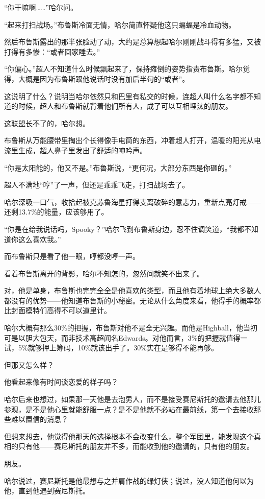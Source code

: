 \documentclass[../main]{subfiles}
\begin{document}
“你干嘛啊\ldots\ldots”哈尔问。

“起来打扫战场。”布鲁斯冷面无情，哈尔简直怀疑他这只蝙蝠是冷血动物。

然后布鲁斯露出的那半张脸动了动，大约是总算想起哈尔刚刚战斗得有多猛，又被打得有多惨：“或者回家睡去。”

“你偏心。”超人不知道什么时候飘起来了，保持瘫倒的姿势指责布鲁斯。哈尔觉得，大概是因为布鲁斯跟他说话时没有加后半句的“或者”。

这说明了什么？说明当哈尔依然只和巴里有私交的时候，连超人叫什么名字都不知道的时候，超人和布鲁斯就背着他们所有人，成了可以互相埋汰的朋友。

这联盟长不了的，哈尔想。

布鲁斯从万能腰带里掏出个长得像手电筒的东西，冲着超人打开，温暖的阳光从电流里生成，超人鼻子里发出了舒适的呻吟声。

“你是太阳能的，他又不是。”布鲁斯说，“更何况，大部分东西是你砸的。”

超人不满地“哼”了一声，但还是乖乖飞走，打扫战场去了。

哈尔深吸一口气，收拾起被克苏鲁海星打得支离破碎的意志力，重新点亮灯戒——还剩13.7\%的能量，应该够用了。

“你是在给我说话吗，Spooky？”哈尔飞到布鲁斯身边，忍不住调笑道，“我都不知道你这么喜欢我。”

而布鲁斯只是看了他一眼，哼都没哼一声。

看着布鲁斯离开的背影，哈尔不知怎的，忽然间就笑不出来了。

对，他是单身，布鲁斯也完完全全是他喜欢的类型，而且他有着地球上绝大多数人都没有的优势——他知道布鲁斯的小秘密。无论从什么角度来看，他得手的概率都比封面模特们高得不可以道里计。

哈尔大概有那么30\%的把握，布鲁斯对他不是全无兴趣。而他是Highball，他当初可是以胆大包天，而非技术高超闻名Edwards。对他而言，3\%的把握就值得一试，5\%就够押上筹码，10\%就该出手了。30\%实在是够得不能再够。

但那又怎么样？

他看起来像有时间谈恋爱的样子吗？

哈尔后来也想过，如果那一天他是去泡男人，而不是接受赛尼斯托的邀请去他那儿参观，是不是他心里就能舒服一点？是不是他就不必站在最前线，第一个去接收那些难以置信的消息？

但想来想去，他觉得他那天的选择根本不会改变什么，整个军团里，能发现这个真相的只有他——赛尼斯托的朋友并不多，而能收到他的邀请的，只有他的朋友。

朋友。

哈尔说过，赛尼斯托是他最想与之并肩作战的绿灯侠；说过，没人知道他何以为他，直到他遇到赛尼斯托。
\end{document}
